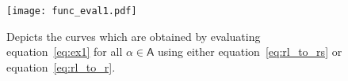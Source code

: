 \documentclass[twoside,reqno,11pt]{fcaa-var} %
\begin{document}

\begin{figure}[htb]
\centering
\texttt{[image: func\_eval1.pdf]}
\caption{Depicts the curves which are obtained by evaluating equation~\eqref{eq:ex1} for all $\alpha\in \mathsf{A}$ using either equation~\eqref{eq:rl_to_rs} or equation~\eqref{eq:rl_to_r}.}
\label{fig:eval1}
\end{figure}
\end{document}
